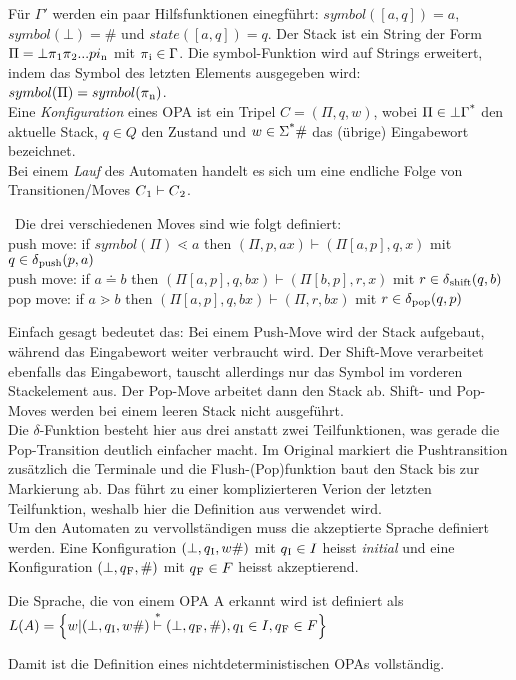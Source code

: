 Für $\Gamma ' $ werden ein paar Hilfsfunktionen einegführt: $symbol(\left[ a, q \right]) = a$, $symbol(\bot) = \#$ und $state(\left[ a, q \right]) = q$. Der Stack ist ein String der Form $\Pi = \bot \pi \textsubscript{1} \pi \textsubscript{2}... pi\textsubscript{n}$ mit $\pi\textsubscript{i}\in \Gamma$. Die symbol-Funktion wird auf Strings erweitert, indem das Symbol des letzten Elements ausgegeben wird: $symbol(\Pi)=symbol(\pi \textsubscript{n})$.\\
Eine \textit{Konfiguration} eines OPA ist ein Tripel $C = (\Pi, q, w)$, wobei $\Pi \in \bot \Gamma \textsuperscript{*}$ den aktuelle Stack, $q \in Q$ den Zustand und $w \in \Sigma\textsuperscript{*}\#$ das (übrige) Eingabewort bezeichnet.\\
Bei einem \textit{Lauf} des Automaten handelt es sich um eine endliche Folge von Transitionen/Moves $C\textsubscript{1} \vdash C\textsubscript{2}$. 
\begin{definition}[Übergangsfunktionen]\ Die drei verschiedenen Moves sind wie folgt definiert: \\[1ex]
push move: if $symbol(\Pi) \lessdot a $ then $ (\Pi, p, ax) \vdash (\Pi\left[a, p \right], q, x)$ mit $q \in \delta\textsubscript{push}(p,a)$\\[0.5ex]  
push move: if $a \doteq b $ then $ (\Pi\left[a, p \right], q, bx) \vdash (\Pi\left[b, p \right], r, x)$ mit $r \in \delta \textsubscript{shift}(q,b)$\\[0.5ex]
pop move: if $a \gtrdot b $ then $ (\Pi\left[a, p \right], q, bx) \vdash (\Pi, r, bx)$ mit $r \in \delta \textsubscript{pop}(q,p)$
\end{definition}
Einfach gesagt bedeutet das: Bei einem Push-Move wird der Stack aufgebaut, während das Eingabewort weiter verbraucht wird. Der Shift-Move verarbeitet ebenfalls das Eingabewort, tauscht allerdings nur das Symbol im vorderen Stackelement aus. Der Pop-Move arbeitet dann den Stack ab. Shift- und Pop-Moves werden bei einem leeren Stack nicht ausgeführt.\\
Die $\delta$-Funktion besteht hier aus drei anstatt zwei Teilfunktionen, was gerade die Pop-Transition deutlich einfacher macht. Im Original markiert die Pushtransition zusätzlich die Terminale und die Flush-(Pop)funktion baut den Stack bis zur Markierung ab. Das führt zu einer komplizierteren Verion der letzten Teilfunktion, weshalb hier die Definition aus \cite{mso} verwendet wird.\\
Um den Automaten zu vervollständigen muss die akzeptierte Sprache definiert werden. Eine Konfiguration $(\bot, q\textsubscript{I}, w\#)$ mit $q\textsubscript{I} \in I$ heisst \textit{initial} und eine Konfiguration $(\bot, q\textsubscript{F}, \#)$ mit $q\textsubscript{F} \in F$ heisst akzeptierend.
\begin{definition}
Die Sprache, die von einem OPA A erkannt wird ist definiert als\\
$L(A)=  \Big \{ w | (\bot, q\textsubscript{I}, w\#) \overset{*}{\vdash} (\bot, q \textsubscript{F},\#), q\textsubscript{I} \in I, q \textsubscript{F} \in F \Big \}$
\end{definition}
Damit ist die Definition eines nichtdeterministischen OPAs vollständig.
